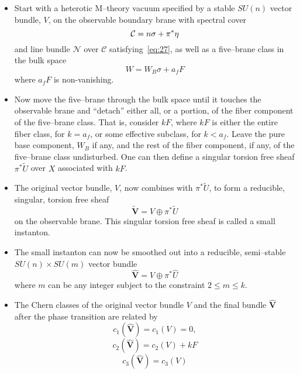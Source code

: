 \documentclass[a4paper,12pt]{article}
\numberwithin{equation}{section}
\newcommand{\bV}{{\mathbf V}}
\def\cC{{\mathcal C}}
\def\cN{{\mathcal N}}
\theoremstyle{plain}
\begin{document}
\begin{itemize}

\item Start with a heterotic M--theory vacuum specified by
a stable $SU(n)$ vector bundle, $V$, on the observable boundary
brane with spectral cover
\begin{equation}
{\cal{C}}= n\sigma+ \pi^{*}\eta
\label{eq:185}
\end{equation}
and line bundle $\cN$ over $\cC$ satisfying~\eqref{eq:27},
as well as a five--brane class in the bulk space 
\begin{equation}
W=W_{B}\sigma +a_{f}F
\label{eq:186}
\end{equation}
where $a_{f}F$ is non-vanishing. 


\item Now move the five--brane through the bulk space until it touches 
the observable brane and ``detach'' either
all, or a portion, of the fiber component of the five--brane class.
That is, consider $kF$, where $kF$ is either the entire fiber class, for
$k=a_{f}$, or some effective subclass, for $k<a_{f}$.
Leave the pure base component, $W_{B}$ if any, and the rest of the fiber component, 
if any, of the five--brane class undisturbed. One can then define a singular
torsion free sheaf $\pi^{*}\widetilde{U}$ over $X$ associated with $kF$.


\item The original vector bundle, $V$, now combines with 
$\pi^{*}\widetilde{U}$, to form a reducible, singular, torsion free sheaf
\begin{equation}
\widetilde{\bV}= V \oplus \pi^{*}\tilde{U}
\label{eq:187}
\end{equation}
on the observable brane. 
This singular torsion free sheaf is called a small instanton.

\item The small instanton can now be smoothed out into a reducible,
semi--stable $SU(n) \times SU(m)$ vector bundle 
\begin{equation}
\widehat{\bV}= V \oplus \pi^{*}\hat{U}
\label{eq:188}
\end{equation}
where $m$ can be any integer subject to the constraint $2 \leq m \leq k$.


\item The Chern classes of the original vector bundle $V$ and the final bundle
$\widehat{\bV}$ after the phase transition are related by
\begin{equation}
c_{1}(\widehat{\bV})=c_{1}(V)=0,
\label{eq:189}
\end{equation}
\begin{equation}
c_{2}(\widehat{\bV})=c_{2}(V) +kF
\label{eq:190}
\end{equation}
\begin{equation}
c_{3}(\widehat{\bV})=c_{3}(V)
\label{eq:191}
\end{equation}


\end{itemize}
\end{document}
